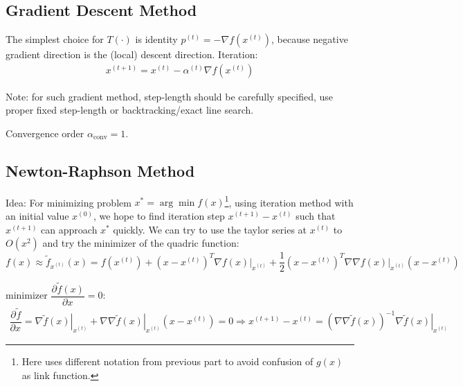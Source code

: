     

\subsection{Gradient Descent Method}
    \hypertarget{GradientDescent}{}The simplest choice for $ T(\cdot) $ is identity $ p^{(t)}=-\nabla f\left(x^{(t)}\right) $, because negative gradient direction is the (local) descent direction. Iteration:
    \begin{align}
        x^{(t+1)}=x^{(t)} -\alpha ^{(t)}\nabla f\left(x^{(t)}\right) 
    \end{align}
    
    Note: for such gradient method, step-length should be carefully specified, use proper fixed step-length or backtracking/exact line search.

    Convergence order $ \alpha_\mathrm{conv}  =1 $.

    
    
    
    


\subsection{Newton-Raphson Method}
\hypertarget{NRMethod}{}
    Idea: For minimizing problem $ x^*=\arg\min f(x) $\footnote{Here uses different notation from previous part to avoid confusion of $ g(x) $ as link function.}, using iteration method with an initial value $ x^{(0)} $, we hope to find iteration step $ x^{(t+1)}-x^{(t)} $ such that $ x^{(t+1)} $ can approach $ x^* $ quickly. We can try to use the taylor series at $ x^{(t)} $ to $ O(x^2) $ and try the minimizer of the quadric function:
    \begin{equation}\label{EqaGaussRaphsonQuadricExpansion}
        f(x)\approx \tilde{f}_{x^{(t)}}(x)=f(x^{(t)})+(x-x^{(t)})^T\nabla \left. f(x)\right|_{x^{(t)}}+\dfrac{1}{2}(x-x^{(t)})^T\nabla\nabla \left. f(x) \right|_{x^{(t)}} (x-x^{(t)})
    \end{equation}
    
    
    minimizer $ \dfrac{\partial^{} \tilde{f}(x)}{\partial x^{}}=0 $:
    \begin{align}
        \dfrac{\partial^{} \tilde{f}}{\partial x^{}}=\nabla \left.\tilde{f}(x)\right|_{x^{(t)}}+ \nabla\nabla \left.\tilde{f}(x)\right|_{x^{(t)}}(x-x^{(t)})=0\Rightarrow x^{(t+1)}-x^{(t)}= \left( \nabla\nabla \tilde{f}(x) \right)^{-1}\left.\nabla \tilde{f}(x) \right|_{x^{(t)}}
    \end{align}

